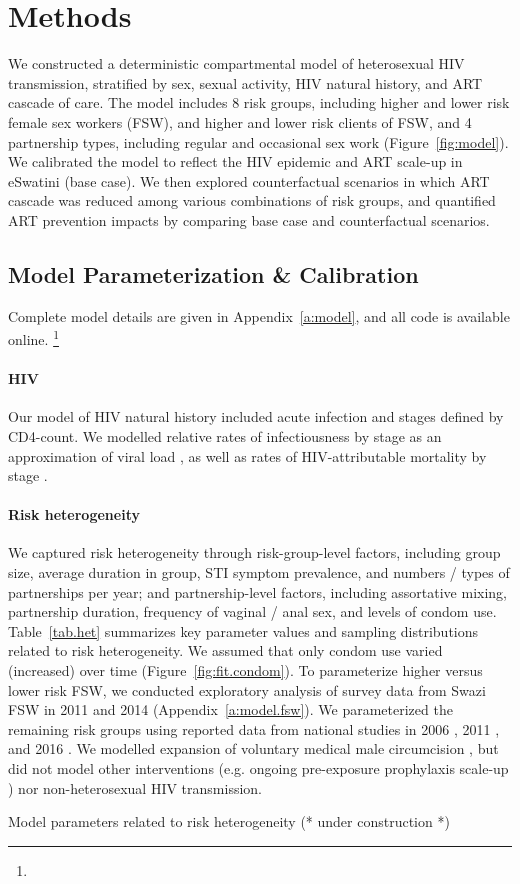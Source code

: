 \section{Methods}\label{meth}
We constructed a deterministic compartmental model of heterosexual HIV transmission,
stratified by sex, sexual activity, HIV natural history, and ART cascade of care.
The model includes 8 risk groups,
including higher and lower risk female sex workers (FSW), and higher and lower risk clients of FSW,
and 4 partnership types, including regular and occasional sex work (Figure~\ref{fig:model}).
We calibrated the model to reflect the HIV epidemic and ART scale-up in eSwatini (base case).
We then explored counterfactual scenarios in which
ART cascade was reduced among various combinations of risk groups,
and quantified ART prevention impacts by comparing base case and counterfactual scenarios.
\subsection{Model Parameterization \& Calibration}\label{meth.param}
Complete model details are given in Appendix~\ref{a:model},
and all code is available online.%
\footnote{}
\paragraph{HIV}
Our model of HIV natural history included acute infection and stages defined by CD4-count.
We modelled relative rates of infectiousness by stage
as an approximation of viral load \cite{Wawer2005,Boily2009,Donnell2010},
as well as rates of HIV-attributable mortality by stage \cite{Badri2006,Anglaret2012,Mangal2017}.
\paragraph{Risk heterogeneity}
We captured risk heterogeneity through risk-group-level factors, including
group size, average duration in group, STI symptom prevalence,
and numbers / types of partnerships per year;
and partnership-level factors, including
assortative mixing, partnership duration, frequency of vaginal / anal sex, and levels of condom use.
Table~\ref{tab.het} summarizes key parameter values and sampling distributions
related to risk heterogeneity.
We assumed that only condom use varied (increased) over time (Figure~\ref{fig:fit.condom}).
To parameterize higher versus lower risk FSW, we conducted exploratory analysis of
survey data from Swazi FSW in 2011 \cite{Baral2014} and 2014 \cite{EswKP2014} (Appendix~\ref{a:model.fsw}).
We parameterized the remaining risk groups using reported data from national studies in
2006 \cite{SDHS2006}, 2011 \cite{SHIMS1}, and 2016 \cite{SHIMS2}.
We modelled expansion of voluntary medical male circumcision \cite{SHIMS2},
but did not model other interventions (e.g. ongoing pre-exposure prophylaxis scale-up \cite{EswCOP21})
nor non-heterosexual HIV transmission.
\begin{table}
  \centering
  \caption{Model parameters related to risk heterogeneity (* under construction *)}
  
  \label{tab.het}
\end{table}

